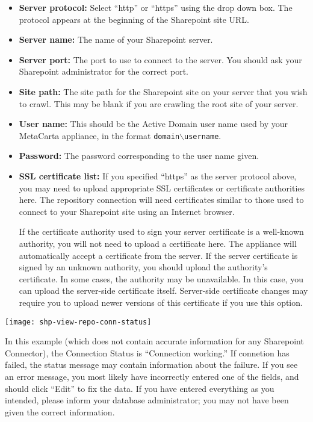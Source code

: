 \begin{itemize}

\item \textbf{Server protocol:} Select ``http'' or ``https'' using the drop down box. The protocol appears at the beginning of the Sharepoint site URL.

\item \textbf{Server name:} The name of your Sharepoint server.

\item \textbf{Server port:} The port to use to connect to the server. You should ask your Sharepoint administrator for the correct port.

\item \textbf{Site path:} The site path for the Sharepoint site on your server that you wish to crawl. This may be blank if you are crawling the root site of your server.

\item \textbf{User name:} This should be the Active Domain user name used by your MetaCarta appliance, in the format \texttt{domain$\backslash$username}.

\item \textbf{Password:} The password corresponding to the user name given.

\item \textbf{SSL certificate list:}
If you specified ``https'' as the server protocol above, you may need to
upload appropriate SSL certificates or certificate authorities here. The
repository connection will need certificates similar to those used to
connect to your Sharepoint site using an Internet browser.

If the certificate authority used to sign your server certificate is a
well-known authority, you will not need to upload a certificate
here. The appliance will automatically accept a certificate from the
server. If the server certificate is signed by an unknown authority,
you should upload the authority's certificate. In some cases, the
authority may be unavailable. In this case, you can upload the
server-side certificate itself. Server-side certificate changes may
require you to upload newer versions of this certificate if you use
this option.

\end{itemize}



\texttt{[image: shp-view-repo-conn-status]}

In this example (which does not contain accurate information for any
Sharepoint Connector), the Connection Status is ``Connection
working.'' If connetion has failed, the status message may contain
information about the failure.  If you see an error message, you most
likely have incorrectly entered one of the fields, and should click
``Edit'' to fix the data. If you have entered everything as you
intended, please inform your database administrator; you may not have
been given the correct information.
